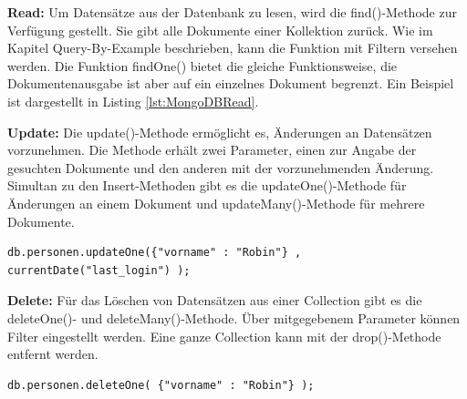 \noindent
{}
\textbf{Read:}
Um Datensätze aus der Datenbank zu lesen, wird die find()-Methode zur Verfügung gestellt. Sie gibt alle Dokumente einer Kollektion zurück. Wie im Kapitel Query-By-Example beschrieben, kann die Funktion mit Filtern versehen werden. Die Funktion findOne() bietet die gleiche Funktionsweise, die Dokumentenausgabe ist aber auf ein einzelnes Dokument begrenzt. 
Ein Beispiel ist dargestellt in Listing \ref{lst:MongoDBRead}.
\newline\newline

\noindent
{}
\textbf{Update:}
Die update()-Methode ermöglicht es, Änderungen an Datensätzen vorzunehmen.  Die Methode erhält zwei Parameter, einen zur Angabe der gesuchten Dokumente und den anderen mit  der vorzunehmenden Änderung. Simultan zu den Insert-Methoden gibt es die updateOne()-Methode für Änderungen an einem Dokument und updateMany()-Methode für mehrere Dokumente.
\newline

\begin{lstlisting}[caption=MongoDB Update, label=lst:MongoDBUpdate]
db.personen.updateOne({"vorname" : "Robin"} , currentDate("last_login") );

\end{lstlisting}

\noindent
{}
\textbf{Delete:}
Für das Löschen von Datensätzen aus einer Collection gibt es die deleteOne()- und deleteMany()-Methode. Über mitgegebenem Parameter können Filter eingestellt werden. Eine ganze Collection kann mit der drop()-Methode entfernt werden.
\newline

\begin{lstlisting}[caption=MongoDB Remove, label=lst:MongoDBRemove]
db.personen.deleteOne( {"vorname" : "Robin"} );

\end{lstlisting}

\noindent
